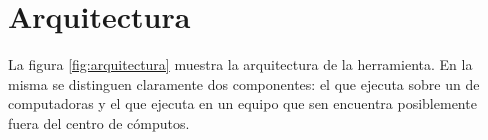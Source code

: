 
\section{Arquitectura}

La figura \ref{fig:arquitectura} muestra la arquitectura de la herramienta. En
la misma se distinguen claramente dos componentes: el \bend que ejecuta sobre
un \cluster de computadoras y el \fend que ejecuta en un equipo que sen
encuentra posiblemente fuera del centro de cómputos.

